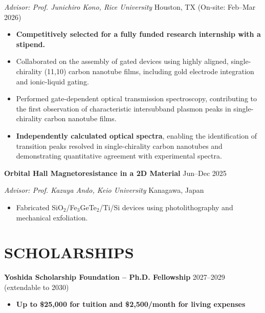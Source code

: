 \documentclass[11pt]{article}
\newcommand{\highlight}[1]{\textcolor{blue!60!cyan}{\textbf{#1}}}
\begin{document}
\textit{Advisor: Prof. Junichiro Kono, Rice University}
\hfill Houston, TX (On-site: Feb--Mar 2026)
\begin{itemize}
\item \highlight{Competitively selected for a fully funded research internship with a stipend.}
\item Collaborated on the assembly of gated devices using
highly aligned, single-chirality (11,10) carbon nanotube films,
including gold electrode integration and ionic-liquid gating.

\item Performed gate-dependent optical transmission spectroscopy, 
contributing to the first observation of characteristic
intersubband plasmon peaks in single-chirality carbon nanotube films.

\item \highlight{Independently calculated optical spectra},
enabling the identification of transition peaks resolved in single-chirality
carbon nanotubes and demonstrating quantitative
agreement with experimental spectra.

\end{itemize}


\vspace{5pt}

\textbf{Orbital Hall Magnetoresistance in a 2D Material}
\hfill Jun--Dec 2025

\textit{Advisor: Prof. Kazuya Ando, Keio University}
\hfill Kanagawa, Japan

\begin{itemize}
    \item Fabricated SiO$_2$/Fe$_3$GeTe$_2$/Ti/Si devices using photolithography and mechanical exfoliation.
\end{itemize}



\section*{SCHOLARSHIPS}
\textbf{Yoshida Scholarship Foundation -- \highlight{Ph.D. Fellowship}}
\hfill 2027--2029 (extendable to 2030)
\begin{itemize}
\item \highlight{Up to \$25,000 for tuition and \$2,500/month for living expenses}
\end{itemize}
\vspace{3pt}
\end{document}
